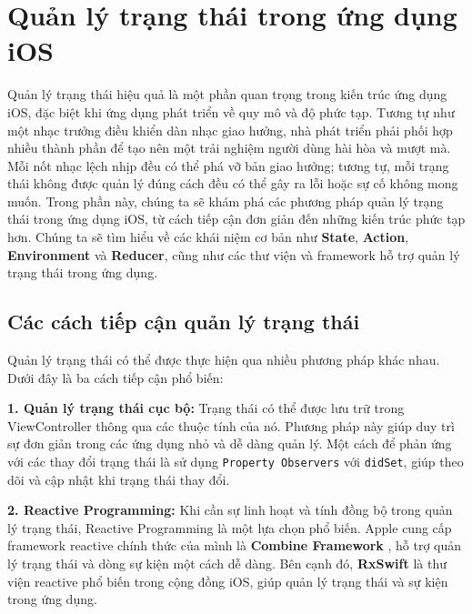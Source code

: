\section{Quản lý trạng thái trong ứng dụng iOS}

Quản lý trạng thái hiệu quả là một phần quan trọng trong kiến trúc ứng dụng iOS, đặc biệt khi ứng dụng phát triển về quy mô và độ phức tạp. Tương tự như một nhạc trưởng điều khiển dàn nhạc giao hưởng, nhà phát triển phải phối hợp nhiều thành phần để tạo nên một trải nghiệm người dùng hài hòa và mượt mà. Mỗi nốt nhạc lệch nhịp đều có thể phá vỡ bản giao hưởng; tương tự, mỗi trạng thái không được quản lý đúng cách đều có thể gây ra lỗi hoặc sự cố không mong muốn.
Trong phần này, chúng ta sẽ khám phá các phương pháp quản lý trạng thái trong ứng dụng iOS, từ cách tiếp cận đơn giản đến những kiến trúc phức tạp hơn. Chúng ta sẽ tìm hiểu về các khái niệm cơ bản như \textbf{State}, \textbf{Action}, \textbf{Environment} và \textbf{Reducer}, cũng như các thư viện và framework hỗ trợ quản lý trạng thái trong ứng dụng.
\subsection{Các cách tiếp cận quản lý trạng thái}

Quản lý trạng thái có thể được thực hiện qua nhiều phương pháp khác nhau. Dưới đây là ba cách tiếp cận phổ biến:

\vspace{0.5em}

\textbf{1. Quản lý trạng thái cục bộ:} Trạng thái có thể được lưu trữ trong ViewController thông qua các thuộc tính của nó. Phương pháp này giúp duy trì sự đơn giản trong các ứng dụng nhỏ và dễ dàng quản lý. Một cách để phản ứng với các thay đổi trạng thái là sử dụng \texttt{Property Observers} với \texttt{didSet}, giúp theo dõi và cập nhật khi trạng thái thay đổi.

\vspace{0.5em}

\textbf{2. Reactive Programming:} Khi cần sự linh hoạt và tính đồng bộ trong quản lý trạng thái, Reactive Programming là một lựa chọn phổ biến. Apple cung cấp framework reactive chính thức của mình là \textbf{Combine Framework} \cite{Combine-Framework}, hỗ trợ quản lý trạng thái và dòng sự kiện một cách dễ dàng. Bên cạnh đó, \textbf{RxSwift} là thư viện reactive phổ biến trong cộng đồng iOS, giúp quản lý trạng thái và sự kiện trong ứng dụng.

\vspace{0.5em}

